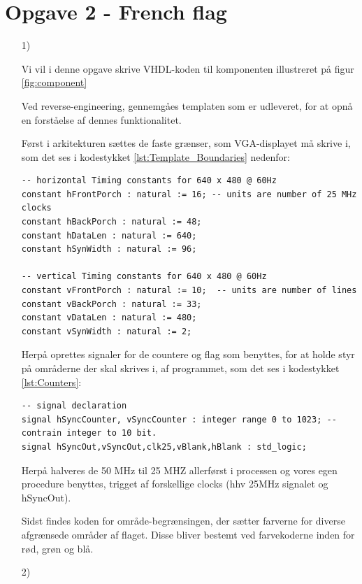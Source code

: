 \clearpage
\section{Opgave 2 - French flag}

\begin{enumerate}
\item[1)]

	
Vi vil i denne opgave skrive VHDL-koden til komponenten illustreret på figur \ref{fig:component}


Ved reverse-engineering, gennemgåes templaten som er udleveret, for at opnå en forståelse af dennes funktionalitet.
	
Først i arkitekturen sættes de faste grænser, som VGA-displayet må skrive i, som det ses i kodestykket \ref{lst:Template_Boundaries} nedenfor:
	\begin{lstlisting}[caption={Template Boundaries},label={lst:Template_Boundaries}]
-- horizontal Timing constants for 640 x 480 @ 60Hz
constant hFrontPorch : natural := 16; -- units are number of 25 MHz clocks
constant hBackPorch : natural := 48; 
constant hDataLen : natural := 640;
constant hSynWidth : natural := 96;

-- vertical Timing constants for 640 x 480 @ 60Hz 
constant vFrontPorch : natural := 10;  -- units are number of lines
constant vBackPorch : natural := 33;
constant vDataLen : natural := 480;
constant vSynWidth : natural := 2;

	\end{lstlisting}
	
Herpå oprettes signaler for de countere og flag som benyttes, for at holde styr på områderne der skal skrives i, af programmet, som det ses i kodestykket \ref{lst:Counters}:
\begin{lstlisting}[caption={Signal declaration},label={lst:Counters}]
-- signal declaration
signal hSyncCounter, vSyncCounter : integer range 0 to 1023; -- contrain integer to 10 bit.
signal hSyncOut,vSyncOut,clk25,vBlank,hBlank : std_logic;
\end{lstlisting}
	
Herpå halveres de 50 MHz til 25 MHZ allerførst i processen og vores egen procedure benyttes, trigget af forskellige clocks (hhv 25MHz signalet og hSyncOut).

Sidst findes koden for område-begrænsingen, der sætter farverne for diverse afgrænsede områder af flaget. Disse bliver bestemt ved farvekoderne inden for rød, grøn og blå.

\newpage
\item[2)]


\end{enumerate}
